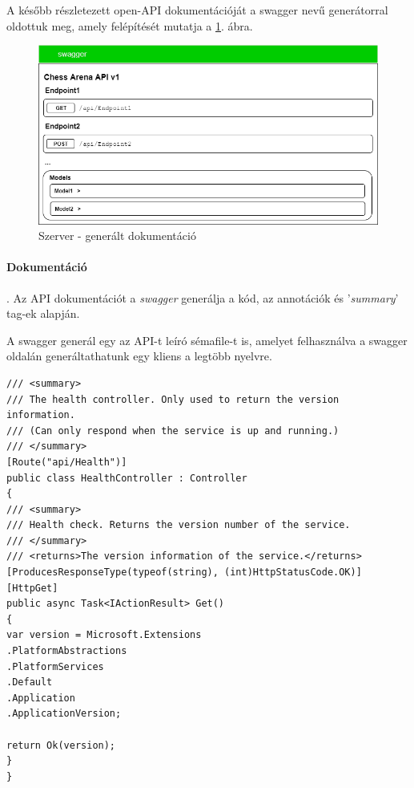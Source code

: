 \documentclass[twoside, a4paper, 12pt]{article}
\begin{document}
A később részletezett open-API dokumentációját a swagger nevű generátorral oldottuk meg, amely felépítését mutatja a \ref{fig:serverUiDocumentation}. ábra.

\begin{figure}[htbp]
	\centering
	\includegraphics[width=1.0\textwidth]{img/serverUiDocumentation.png}
	\caption{Szerver - generált dokumentáció}
	\label{fig:serverUiDocumentation}
\end{figure}




\paragraph{Dokumentáció}. Az API dokumentációt a \textit{swagger}\cite{swaggerHomepage} generálja a kód, az annotációk és '\textit{summary}' tag-ek alapján.

A swagger generál egy az API-t leíró sémafile-t is, amelyet felhasználva a swagger oldalán generáltathatunk egy kliens a legtöbb nyelvre.

\begin{lstlisting}[caption=Health-check példakód 'summary' tag-ekkel., label=lst:healtcheck]
/// <summary>
/// The health controller. Only used to return the version information.
/// (Can only respond when the service is up and running.)
/// </summary>
[Route("api/Health")]
public class HealthController : Controller
{
/// <summary>
/// Health check. Returns the version number of the service.
/// </summary>
/// <returns>The version information of the service.</returns>
[ProducesResponseType(typeof(string), (int)HttpStatusCode.OK)]
[HttpGet]
public async Task<IActionResult> Get()
{
var version = Microsoft.Extensions
.PlatformAbstractions
.PlatformServices
.Default
.Application
.ApplicationVersion;

return Ok(version);
}
}
\end{lstlisting}
\end{document}

